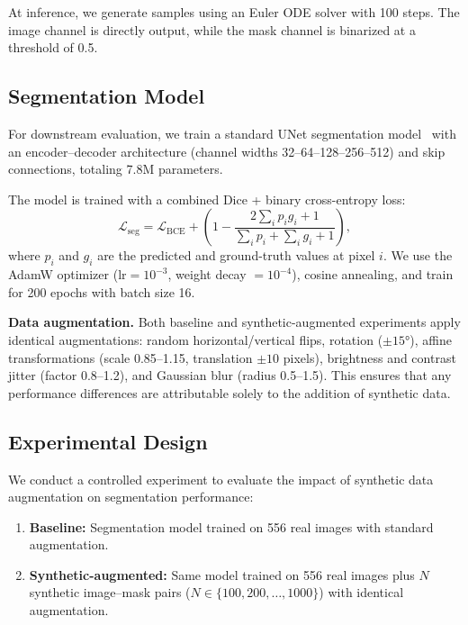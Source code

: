 \documentclass[twocolumn]{article}
\begin{document}
At inference, we generate samples using an Euler ODE solver with 100 steps. The image channel is directly output, while the mask channel is binarized at a threshold of 0.5.

\subsection{Segmentation Model}

For downstream evaluation, we train a standard UNet segmentation model~\cite{ronneberger2015} with an encoder--decoder architecture (channel widths 32--64--128--256--512) and skip connections, totaling 7.8M parameters.

The model is trained with a combined Dice + binary cross-entropy loss:
\begin{equation}
    \mathcal{L}_{\text{seg}} = \mathcal{L}_{\text{BCE}} + \left(1 - \frac{2\sum_i p_i g_i + 1}{\sum_i p_i + \sum_i g_i + 1}\right),
\end{equation}
where $p_i$ and $g_i$ are the predicted and ground-truth values at pixel $i$. We use the AdamW optimizer ($\text{lr} = 10^{-3}$, weight decay $= 10^{-4}$), cosine annealing, and train for 200 epochs with batch size 16.

\textbf{Data augmentation.} Both baseline and synthetic-augmented experiments apply identical augmentations: random horizontal/vertical flips, rotation ($\pm 15°$), affine transformations (scale 0.85--1.15, translation $\pm 10$ pixels), brightness and contrast jitter (factor 0.8--1.2), and Gaussian blur (radius 0.5--1.5). This ensures that any performance differences are attributable solely to the addition of synthetic data.

\subsection{Experimental Design}

We conduct a controlled experiment to evaluate the impact of synthetic data augmentation on segmentation performance:

\begin{enumerate}
    \item \textbf{Baseline:} Segmentation model trained on 556 real images with standard augmentation.
    \item \textbf{Synthetic-augmented:} Same model trained on 556 real images plus $N$ synthetic image--mask pairs ($N \in \{100, 200, \ldots, 1000\}$) with identical augmentation.
\end{enumerate}
\end{document}
